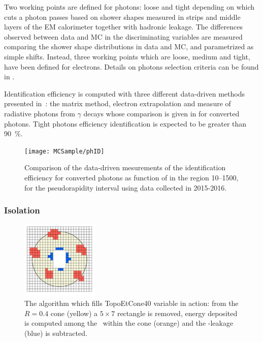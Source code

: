 Two working points are defined for photons: loose and tight depending on which cuts a photon passes based on shower shapes measured in strips and middle layers of the EM calorimeter together with hadronic leakage. The differences observed between data and MC in the discriminating variables are measured comparing the shower shape distributions in data and MC, and parametrized as simple shifts. Instead, three working points which are loose, medium and tight, have been defined for electrons. Details on photons selection criteria can be found in \cite[Sect. 4]{photons}.

Identification efficiency is computed with three different data-driven methods presented in~\cite{photons}: the matrix method, electron extrapolation and measure of radiative photons from  \mbox{\Zboson\rarrow\ellell$\gamma$} decays whose comparison is given in \Fig{\ref{fig:phID}} for converted photons. Tight photons efficiency identification is expected to be greater than \SI{90}{\percent}.

\begin{figure}[pt]
\centering
\texttt{[image: MCSample/phID]}
\caption{Comparison of the data-driven mesurements of the identification efficiency for converted photons as function of \et in the region \SIrange{10}{1500}{\gev}, for the pseudorapidity interval  using data collected in 2015-2016.}
\label{fig:phID}
\end{figure}

\subsubsection{Isolation}
\label{sec:phisolation}
\begin{figure}[tp]
\centering
\includegraphics[width=0.33\textwidth]{MCSample/topoetcone40}
\caption{The algorithm which fills TopoEtCone40 variable in action: from the $R=0.4$ cone (yellow) a $5\times7$ rectangle is removed, energy deposited is computed among the \topo~within the cone (orange) and the \pt-leakage (blue) is subtracted.}
\label{topoetcone40}
\end{figure}

